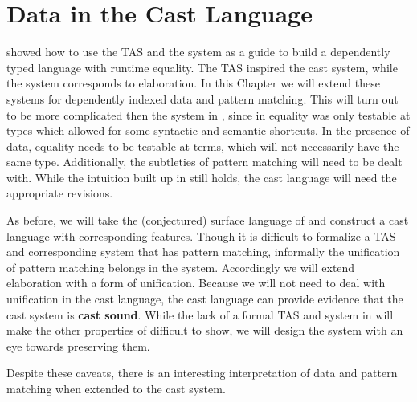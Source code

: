 \chapter{Data in the Cast Language}
\label{chapter:CastData}
\thispagestyle{myheadings}
 
 showed how to use the \ac{TAS} and the \bidir{} system as a guide to build a dependently typed language with runtime equality.
The \ac{TAS} inspired the cast system, while the \bidir{} system corresponds to elaboration.
In this Chapter we will extend these systems for dependently indexed data and pattern matching.
This will turn out to be more complicated then the system in , since in  equality was only testable at types which allowed for some syntactic and semantic shortcuts.
In the presence of data, equality needs to be testable at terms, which will not necessarily have the same type.
Additionally, the subtleties of pattern matching will need to be dealt with.
While the intuition built up in  still holds, the cast language will need the appropriate revisions.
 
As before, we will take the (conjectured) surface language of  and construct a cast language with corresponding features.
Though it is difficult to formalize a \ac{TAS} and corresponding \bidir{} system that has pattern matching, informally the unification of pattern matching belongs in the \bidir{} system.
Accordingly we will extend elaboration with a form of unification.
Because we will not need to deal with unification in the cast language, the cast language can provide evidence that the cast system is \textbf{cast sound}. 
While the lack of a formal \ac{TAS} and \bidir{} system in  will make the other properties of  difficult to show, we will design the system with an eye towards preserving them.
 
 
Despite these caveats, there is an interesting interpretation of data and pattern matching when extended to the cast system.
 
